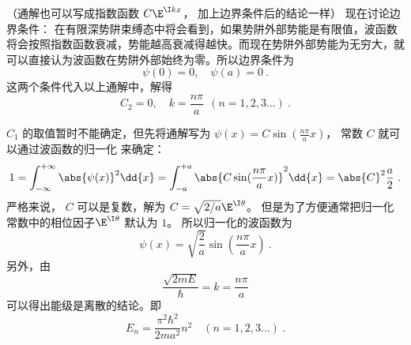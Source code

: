 （通解也可以写成指数函数 $C\E^{\I kx}$， 加上边界条件后的结论一样）
现在讨论边界条件： 在有限深势阱束缚态中将会看到，如果势阱外部势能是有限值，波函数将会按照指数函数衰减，势能越高衰减得越快。而现在势阱外部势能为无穷大，就可以直接认为波函数在势阱外部始终为零。所以边界条件为
\begin{equation}
\psi(0) = 0, \quad \psi(a) = 0~.
\end{equation}
这两个条件代入以上通解中，解得
\begin{equation}
C_2 = 0, \quad k = \frac{n\pi}{a}  \ \ (n = 1,2,3\dots)~.
\end{equation}

$C_1$ 的取值暂时不能确定，但先将通解写为 $\psi(x) = C\sin(\frac{n\pi }{a}x)$， 常数 $C$ 就可以通过波函数的归一化%
来确定：
\begin{equation}
1 = \int_{-\infty }^{+\infty } \abs{\psi(x)}^2 \dd{x}  = \int_{-a}^{+a} \abs{C\sin(\frac{n\pi }{a} x)}^2 \dd{x}  = \abs{C}^2 \frac{a}{2}~.
\end{equation}
严格来说， $C$ 可以是复数，解为 $C = \sqrt{2/a} \E^{\I\theta}$。 但是为了方便通常把归一化常数中的相位因子$\E^{\I\theta}$ 默认为 $1$。 所以归一化的波函数为
\begin{equation}
\psi(x) = \sqrt{\frac{2}{a}} \sin(\frac{n\pi }{a}x)~.
\end{equation}
另外，由
\begin{equation}
\frac{\sqrt{2mE}}{\hbar} = k = \frac{n\pi }{a}
\end{equation}
可以得出能级是离散的结论。即
\begin{equation}
E_n = \frac{\pi^2\hbar^2}{2m a^2} n^2 \quad (n = 1,2,3\dots)~.
\end{equation}
